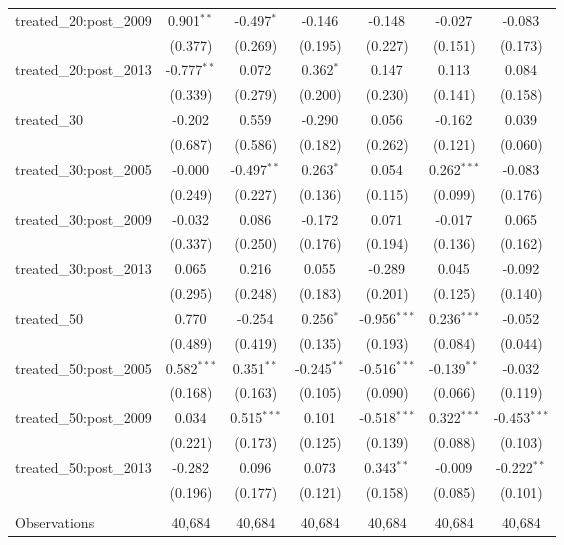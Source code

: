 \begin{table}[!htbp]
\begin{tabular}{@{\extracolsep{5pt}}lcccccc}
 treated_20:post_2009 & 0.901$^{**}$ & -0.497$^{*}$ & -0.146$^{}$ & -0.148$^{}$ & -0.027$^{}$ & -0.083$^{}$ \\
  & (0.377) & (0.269) & (0.195) & (0.227) & (0.151) & (0.173) \\
 treated_20:post_2013 & -0.777$^{**}$ & 0.072$^{}$ & 0.362$^{*}$ & 0.147$^{}$ & 0.113$^{}$ & 0.084$^{}$ \\
  & (0.339) & (0.279) & (0.200) & (0.230) & (0.141) & (0.158) \\
 treated_30 & -0.202$^{}$ & 0.559$^{}$ & -0.290$^{}$ & 0.056$^{}$ & -0.162$^{}$ & 0.039$^{}$ \\
  & (0.687) & (0.586) & (0.182) & (0.262) & (0.121) & (0.060) \\
 treated_30:post_2005 & -0.000$^{}$ & -0.497$^{**}$ & 0.263$^{*}$ & 0.054$^{}$ & 0.262$^{***}$ & -0.083$^{}$ \\
  & (0.249) & (0.227) & (0.136) & (0.115) & (0.099) & (0.176) \\
 treated_30:post_2009 & -0.032$^{}$ & 0.086$^{}$ & -0.172$^{}$ & 0.071$^{}$ & -0.017$^{}$ & 0.065$^{}$ \\
  & (0.337) & (0.250) & (0.176) & (0.194) & (0.136) & (0.162) \\
 treated_30:post_2013 & 0.065$^{}$ & 0.216$^{}$ & 0.055$^{}$ & -0.289$^{}$ & 0.045$^{}$ & -0.092$^{}$ \\
  & (0.295) & (0.248) & (0.183) & (0.201) & (0.125) & (0.140) \\
 treated_50 & 0.770$^{}$ & -0.254$^{}$ & 0.256$^{*}$ & -0.956$^{***}$ & 0.236$^{***}$ & -0.052$^{}$ \\
  & (0.489) & (0.419) & (0.135) & (0.193) & (0.084) & (0.044) \\
 treated_50:post_2005 & 0.582$^{***}$ & 0.351$^{**}$ & -0.245$^{**}$ & -0.516$^{***}$ & -0.139$^{**}$ & -0.032$^{}$ \\
  & (0.168) & (0.163) & (0.105) & (0.090) & (0.066) & (0.119) \\
 treated_50:post_2009 & 0.034$^{}$ & 0.515$^{***}$ & 0.101$^{}$ & -0.518$^{***}$ & 0.322$^{***}$ & -0.453$^{***}$ \\
  & (0.221) & (0.173) & (0.125) & (0.139) & (0.088) & (0.103) \\
 treated_50:post_2013 & -0.282$^{}$ & 0.096$^{}$ & 0.073$^{}$ & 0.343$^{**}$ & -0.009$^{}$ & -0.222$^{**}$ \\
  & (0.196) & (0.177) & (0.121) & (0.158) & (0.085) & (0.101) \\
\hline \\[-1.8ex]
 Observations & 40,684 & 40,684 & 40,684 & 40,684 & 40,684 & 40,684 \\

\end{tabular}
\end{table}

